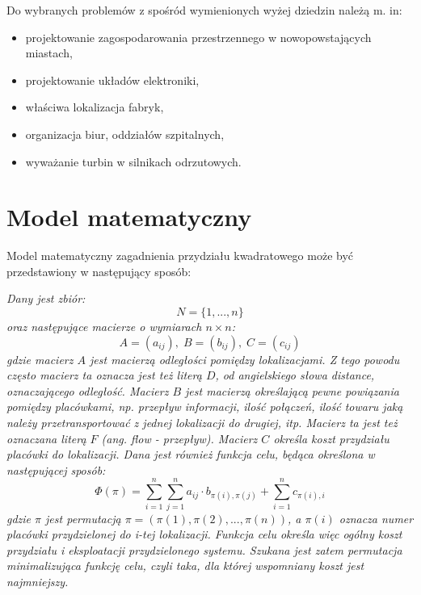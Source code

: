 Do wybranych problemów z spośród wymienionych wyżej dziedzin należą m. in:
\begin{itemize}
\item projektowanie zagospodarowania przestrzennego w nowopowstających miastach,
\item projektowanie układów elektroniki,
\item właściwa lokalizacja fabryk,
\item organizacja biur, oddziałów szpitalnych,
\item wyważanie turbin w silnikach odrzutowych.   
\end{itemize}

\section{Model matematyczny}
\label{sec:model}
Model matematyczny zagadnienia przydziału kwadratowego może być przedstawiony w następujący sposób:

\textit{Dany jest zbiór:}
\newline
\begin{equation}
N=\{1,...,n\}
\end{equation}
\newline
\textit{oraz następujące macierze o wymiarach $n\times n$:}
\newline
\begin{equation}
A=(a_{ij}),\; B=(b_{ij}),\; C=(c_{ij})
\end{equation}
\newline
\textit{gdzie macierz $A$ jest macierzą odległości pomiędzy lokalizacjami. Z tego powodu często macierz ta oznacza jest też literą $D$, od angielskiego słowa distance, oznaczającego odległość. Macierz $B$ jest macierzą określającą pewne powiązania pomiędzy placówkami, np. przepływ informacji, ilość połączeń, ilość towaru jaką należy przetransportować z jednej lokalizacji do drugiej, itp. Macierz ta jest też oznaczana literą $F$ (ang. flow - przepływ). Macierz $C$ określa  koszt przydziału  placówki do lokalizacji.
Dana jest również funkcja celu, będąca określona w następującej sposób:}
\newline
\begin{equation}
\Phi(\pi)=\sum_{i=1}^n\sum_{j=1}^n a_{ij}\cdot b_{\pi(i),\pi(j)} + \sum_{i=1}^n c_{\pi(i),i}
\end{equation}
\newline
\textit{gdzie $\pi$ jest permutacją $\pi=(\pi(1),\pi(2),...,\pi(n))$, a $\pi(i)$ oznacza numer placówki przydzielonej do i-tej lokalizacji. Funkcja celu określa więc ogólny koszt przydziału i eksploatacji przydzielonego systemu. Szukana jest zatem permutacja minimalizująca funkcję celu, czyli taka, dla której wspomniany koszt jest najmniejszy.}

